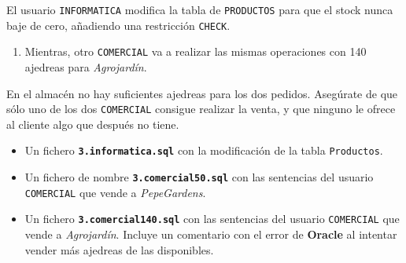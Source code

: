 \newpage

\begin{homeworkProblem}


  El usuario \texttt{INFORMATICA} modifica la tabla de \texttt{PRODUCTOS} para que el stock nunca baje de cero, añadiendo una restricción \texttt{CHECK}.
  
  {

    \begin{enumerate}
    \item Mientras, otro \texttt{COMERCIAL} va a realizar las mismas operaciones con 140 ajedreas para \textit{Agrojardín}.
    \end{enumerate}
  }
  En el almacén no hay suficientes ajedreas para los dos pedidos. Asegúrate de que sólo uno de los dos \texttt{COMERCIAL} consigue realizar la venta, y que ninguno le ofrece al cliente algo que después no tiene.
  

  \begin{Aviso}

    \begin{itemize}
    \item Un fichero \textbf{\texttt{3.informatica.sql}} con la modificación de la tabla \texttt{Productos}.
    \item Un fichero de nombre \textbf{\texttt{3.comercial50.sql}} con las sentencias del usuario \texttt{COMERCIAL} que vende a \textit{PepeGardens}.
    \item Un fichero \textbf{\texttt{3.comercial140.sql}} con las sentencias del usuario \texttt{COMERCIAL} que vende a \textit{Agrojardín}. Incluye un comentario con el error de \textbf{Oracle} al intentar vender más ajedreas de las disponibles.
    \end{itemize}
 
\end{Aviso}

\end{homeworkProblem}

